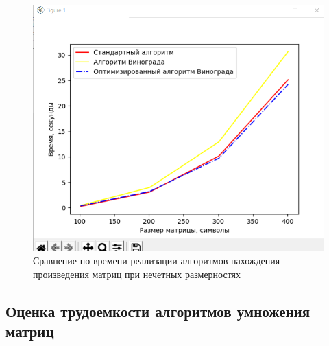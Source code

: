 \documentclass[a4paper,12pt]{article}
\begin{document}
	\begin{figure}[H]
		\centering
		\includegraphics[scale=0.6]{exp2(nechetn).png} 
		\captionsetup{justification=centering}
		\caption{ Сравнение по времени реализации алгоритмов нахождения произведения матриц при нечетных размерностях}
		\label{тест2}
	\end{figure}
	
	
	\subsection{Оценка трудоемкости алгоритмов умножения матриц}
	\hfill
	
\end{document}
